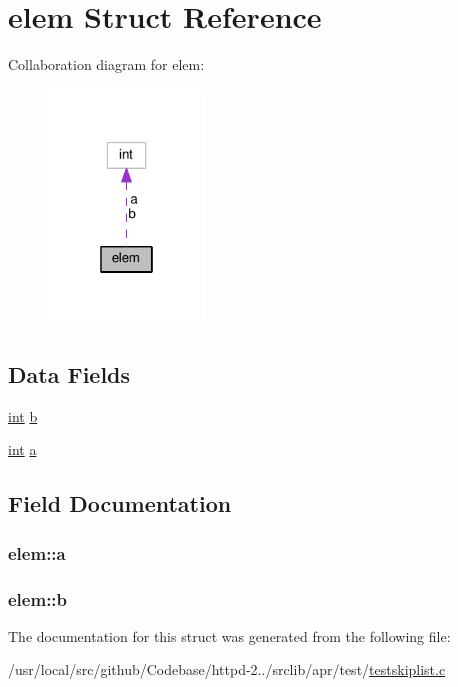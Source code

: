 \hypertarget{structelem}{}\section{elem Struct Reference}
\label{structelem}


Collaboration diagram for elem\+:
\nopagebreak
\begin{figure}[H]
\begin{center}
\leavevmode
\includegraphics[width=118pt]{structelem__coll__graph}
\end{center}
\end{figure}
\subsection*{Data Fields}
\begin{DoxyCompactItemize}
\item 
\hyperlink{pcre_8txt_a42dfa4ff673c82d8efe7144098fbc198}{int} \hyperlink{structelem_aaf3505ebc99ded49f5bcd849e0274ee6}{b}
\item 
\hyperlink{pcre_8txt_a42dfa4ff673c82d8efe7144098fbc198}{int} \hyperlink{structelem_a486ce40957e56f0dccf7bfbfbbd56948}{a}
\end{DoxyCompactItemize}


\subsection{Field Documentation}
\subsubsection[{\texorpdfstring{a}{a}}]{ elem\+::a}\hypertarget{structelem_a486ce40957e56f0dccf7bfbfbbd56948}{}\label{structelem_a486ce40957e56f0dccf7bfbfbbd56948}
\subsubsection[{\texorpdfstring{b}{b}}]{ elem\+::b}\hypertarget{structelem_aaf3505ebc99ded49f5bcd849e0274ee6}{}\label{structelem_aaf3505ebc99ded49f5bcd849e0274ee6}


The documentation for this struct was generated from the following file\+:\begin{DoxyCompactItemize}
\item 
/usr/local/src/github/\+Codebase/httpd-\/2../srclib/apr/test/\hyperlink{testskiplist_8c}{testskiplist.\+c}\end{DoxyCompactItemize}
